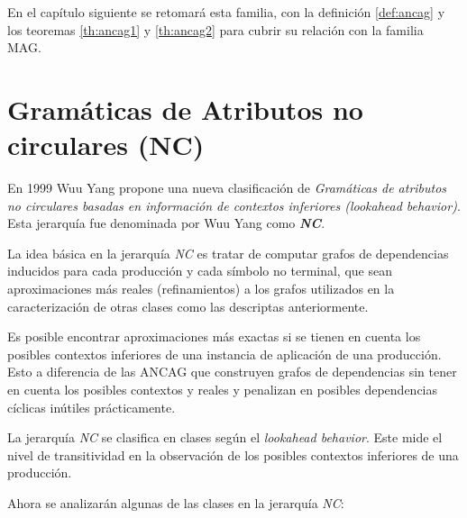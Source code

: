 En el capítulo siguiente se retomará esta familia, con la definición \ref{def:ancag} y los teoremas \ref{th:ancag1} y \ref{th:ancag2} para cubrir su relación con la familia MAG.

\section{Gramáticas de Atributos no circulares (NC)}
\label{sec:gramNC}
En 1999 Wuu Yang\cite{wuu-yang2} propone una nueva clasificación de \emph{Gramáticas de atributos no circulares basadas en información de contextos inferiores (lookahead behavior)}. Esta jerarquía fue denominada por Wuu Yang como  \emph{\textbf{NC}}.

La idea básica en la jerarquía \emph{NC} es tratar de computar grafos de dependencias inducidos para cada producción y cada símbolo no terminal, que sean aproximaciones más reales (refinamientos) a los grafos utilizados en la caracterización de otras clases como las descriptas anteriormente. 

Es posible encontrar aproximaciones más exactas si se tienen en cuenta los posibles contextos inferiores de una instancia de aplicación de una producción. Esto a diferencia de las ANCAG que construyen grafos de dependencias sin tener en cuenta los posibles contextos y reales y penalizan en posibles dependencias cíclicas inútiles prácticamente. 

La jerarquía \emph{NC} se clasifica en clases según el \textit{lookahead behavior}. Este mide el nivel de transitividad en la observación de los posibles contextos inferiores de una producción.

Ahora se analizarán algunas de las clases en la jerarquía \emph{NC}:

